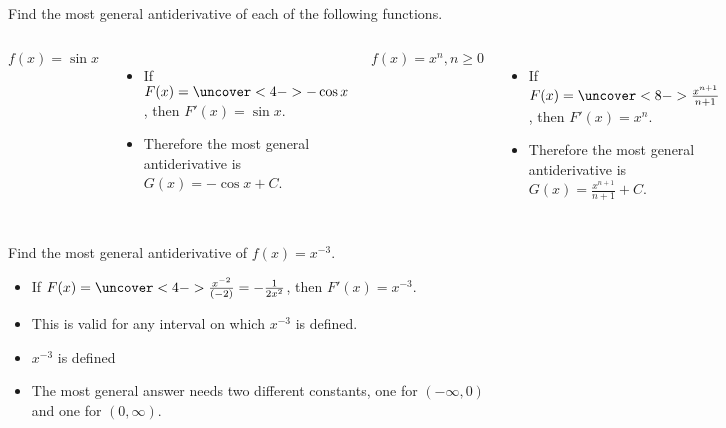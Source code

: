 \begin{frame}
\begin{example}[Example 1, p. 275]
Find the most general antiderivative of each of the following functions.
\begin{columns}[c]
\[
f(x) = \sin x%
\]
\begin{itemize}
\item<2->  If \alert<handout:0| 3-4>{$F(x) = \uncover<4->{-\cos x}$}, then $F'(x) = \sin x$.
\item<5->  Therefore the most general antiderivative is $G(x) = -\cos x + C$.
\end{itemize}
\[
f(x) = x^n, n\geq 0%
\]
\begin{itemize}
\item<6->  If \alert<handout:0| 7-8>{$F(x) = \uncover<8->{\frac{x^{n+1}}{n+1}}$}, then $F'(x) = x^n$.
\item<9->  Therefore the most general antiderivative is $G(x) = \frac{x^{n+1}}{n+1} + C$.
\end{itemize}
\end{columns}
\end{example}
\end{frame}


\begin{frame}
\begin{example}[Example 1c, p. 275]
Find the most general antiderivative of $f(x) = x^{-3}$.%
\begin{itemize}
\item<2->  If \alert<handout:0| 3-4>{$F(x) = \uncover<4->{\frac{x^{-2}}{(-2)} = -\frac{1}{2x^2}}$}, then $F'(x) = x^{-3}$.
\item<5->  This is valid for any interval on which $x^{-3}$ is defined.
\item<6-| alert@6-7>  $x^{-3}$ is defined 
\item<8->  The most general answer needs two different constants, one for $(-\infty , 0)$ and one for $(0, \infty )$.
\end{itemize}
%
\end{example}
\end{frame}
